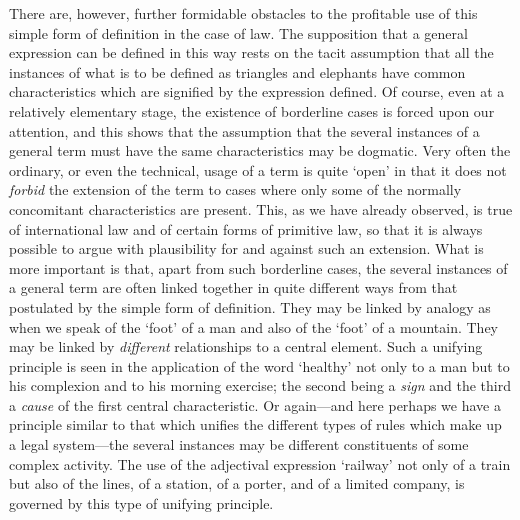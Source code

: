 There are, however, further formidable obstacles to the profitable use
of this simple form of definition in the case of law. The supposition
that a general expression can be defined in this way rests on the tacit
assumption that all the instances of what is to be defined as triangles
and elephants have common characteristics which are signified by the
expression defined. Of course, even at a relatively elementary stage,
the existence of borderline cases is forced upon our attention, and this
shows that the assumption that the several instances of a general term
must have the same characteristics may be dogmatic. Very often the
ordinary, or even the technical, usage of a term is quite `open' in that
it does not \emph{forbid} the extension of the term to cases where only
some of the normally concomitant characteristics are present. This, as
we have already observed, is true of international law and of certain
forms of primitive law, so that it is always possible to argue with
plausibility for and against such an extension. What is more important
is that, apart from such borderline cases, the several instances of a
general term are often linked together in quite different ways from that
postulated by the simple form of definition. They may be linked by
analogy as when we speak of the `foot' of a man and also of the `foot'
of a mountain. They may be linked by \emph{different} relationships to a
central element. Such a unifying principle is seen in the application of
the word `healthy' not only to a man but to his complexion and to his
morning exercise; the second being a \emph{sign} and the third a
\emph{cause} of the first central characteristic. Or again---and here
perhaps we have a principle similar to that which unifies the different
types of rules which make up a legal system---the several instances may
be different constituents of some complex activity. The use of the
adjectival expression `railway' not only of a train but also of the
lines, of a station, of a porter, and of a limited company, is governed
by this type of unifying principle.

